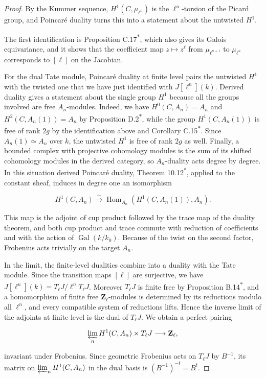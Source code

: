 \documentclass[11pt]{article}
\newcommand{\bpout}[1]{#1\textsuperscript{\hyperlink{bp-outside}{\ensuremath{\ast}}}}
\providecommand{\Hom}{}\renewcommand{\Hom}{\operatorname{Hom}}
\begin{document}
\begin{proof}[{Proof}]\label{bp49}%
By the Kummer sequence, \(H^1(C,\mu_{\ell^n})\) is the \(\ell^n\)-torsion of the Picard group, and Poincaré duality turns this into a statement about the untwisted \(H^1\).

The first identification is Proposition \bpout{C.17}, which also gives its Galois equivariance, and it shows that the coefficient map \(z\mapsto z^\ell\) from \(\mu_{\ell^{n+1}}\) to \(\mu_{\ell^n}\) corresponds to \([\ell]\) on the Jacobian.

For the dual Tate module, Poincaré duality at finite level pairs the untwisted \(H^1\) with the twisted one that we have just identified with \(J[\ell^n](k)\). Derived duality gives a statement about the single group \(H^1\) because all the groups involved are free \(A_n\)-modules. Indeed, we have \(H^0(C,A_n)=A_n\) and \(H^2(C,A_n(1))=A_n\) by Proposition \bpout{D.2}, while the group \(H^1(C,A_n(1))\) is free of rank \(2g\) by the identification above and Corollary \bpout{C.15}. Since \(A_n(1)\simeq A_n\) over \(k\), the untwisted \(H^1\) is free of rank \(2g\) as well. Finally, a bounded complex with projective cohomology modules is the sum of its shifted cohomology modules in the derived category, so \(A_n\)-duality acts degree by degree. In this situation derived Poincaré duality, Theorem \bpout{10.12}, applied to the constant sheaf, induces in degree one an isomorphism

\[
H^1(C,A_n)\xrightarrow{\sim}
\Hom_{A_n}(H^1(C,A_n(1)),A_n).
\]

This map is the adjoint of cup product followed by the trace map of the duality theorem, and both cup product and trace commute with reduction of coefficients and with the action of \(\operatorname{Gal}(k/k_0)\).  Because of the twist on the second factor, Frobenius acts trivially on the target \(A_n\).

In the limit, the finite-level dualities combine into a duality with the Tate module. Since the transition maps \([\ell]\) are surjective, we have \(J[\ell^n](k)=T_\ell J/\ell^nT_\ell J\). Moreover \(T_\ell J\) is finite free by Proposition \bpout{B.14}, and a homomorphism of finite free \(\mathbf Z_\ell\)-modules is determined by its reductions modulo all \(\ell^n\), and every compatible system of reductions lifts. Hence the inverse limit of the adjoints at finite level is the dual of \(T_\ell J\). We obtain a perfect pairing

\[
\varprojlim_nH^1(C,A_n)\times T_\ell J\longrightarrow\mathbf Z_\ell,
\]

invariant under Frobenius.  Since geometric Frobenius acts on \(T_\ell J\) by \(B^{-1}\), its matrix on \(\varprojlim_nH^1(C,A_n)\) in the dual basis is \((B^{-1})^{-t}=B^t\).
\end{proof}
\end{document}

